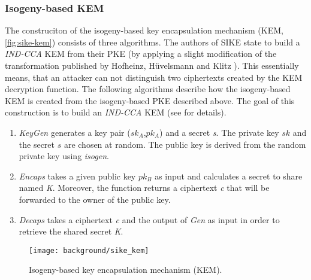 \subsubsection{Isogeny-based \gls{KEM}}
The construciton of the isogeny-based key encapsulation mechanism (\gls{KEM}, \autoref{fig:sike-kem}) consists of three algorithms. The authors of \gls{SIKE} state to build a \textit{IND-CCA} \gls{KEM} from their \gls{PKE} \parencite{sike2020spec} (by applying a slight modification of the transformation published by Hofheinz, Hüvelsmann and Klitz \parencite{cryptoeprint:2017:604}). This essentially means, that an attacker can not distinguish two ciphertexts created by the \gls{KEM} decryption function. The following algorithms describe how the isogeny-based \gls{KEM} is created from the isogeny-based \gls{PKE} described above. The goal of this construction is to build an \textit{IND-CCA} \gls{KEM} (see \parencite{cryptoeprint:2017:604} for details).
\begin{enumerate}
\item \textit{KeyGen} generates a key pair ($sk_A$,$pk_A$) and a secret \textit{s}. The private key $sk$ and the secret $s$ are chosen at random. The public key is derived from the random private key using \textit{isogen}.
\item \textit{Encaps} takes a given public key $pk_B$ as input and calculates a secret to share named \textit{K}. Moreover, the function returns a ciphertext \textit{c} that will be forwarded to the owner of the public key.
\item \textit{Decaps} takes a ciphertext \textit{c} and the output of \textit{Gen} as input in order to retrieve the shared secret \textit{K}.
\end{enumerate}
\begin{figure}[H]
  \centering
  \texttt{[image: background/sike\_kem]}
  \caption[Isogeny-based \gls{KEM}]
  {Isogeny-based key encapsulation mechanism (\gls{KEM}).} \label{fig:sike-kem}
\end{figure}

